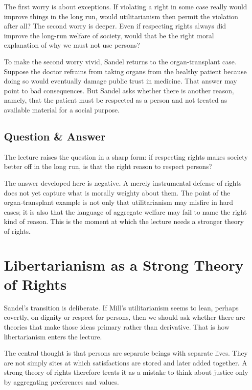 The first worry is about exceptions. If violating a right in some case really would improve things in the long run, would utilitarianism then permit the violation after all? The second worry is deeper. Even if respecting rights always did improve the long-run welfare of society, would that be the right moral explanation of why we must not use persons?

To make the second worry vivid, Sandel returns to the organ-transplant case. Suppose the doctor refrains from taking organs from the healthy patient because doing so would eventually damage public trust in medicine. That answer may point to bad consequences. But Sandel asks whether there is another reason, namely, that the patient must be respected as a person and not treated as available material for a social purpose.

\subsection{Question \& Answer}

The lecture raises the question in a sharp form: if respecting rights makes society better off in the long run, is that the right reason to respect persons?

The answer developed here is negative. A merely instrumental defense of rights does not yet capture what is morally weighty about them. The point of the organ-transplant example is not only that utilitarianism may misfire in hard cases; it is also that the language of aggregate welfare may fail to name the right kind of reason. This is the moment at which the lecture needs a stronger theory of rights.

\section{Libertarianism as a Strong Theory of Rights}

Sandel's transition is deliberate. If Mill's utilitarianism seems to lean, perhaps covertly, on dignity or respect for persons, then we should ask whether there are theories that make those ideas primary rather than derivative. That is how libertarianism enters the lecture.

The central thought is that persons are separate beings with separate lives. They are not simply sites at which satisfactions are stored and later added together. A strong theory of rights therefore treats it as a mistake to think about justice only by aggregating preferences and values.

